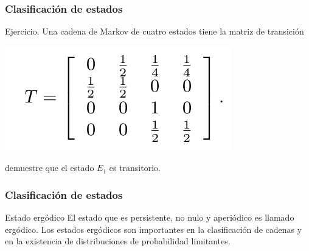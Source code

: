 \documentclass[spanish]{beamer}
\begin{document}
\begin{frame}
\frametitle{Clasificación de estados}
Ejercicio. Una cadena de Markov de cuatro estados tiene la matriz de transición
 
\begin{center}
\includegraphics[scale=0.4]{im45}
\end{center}

demuestre que el estado $E_{1}$ es transitorio.


\end{frame}

\begin{frame}
\frametitle{Clasificación de estados}

\begin{block}{Estado ergódico}
El estado que es persistente, no nulo y aperiódico es llamado ergódico. Los estados ergódicos son importantes en la clasificación de cadenas y en la existencia de distribuciones de probabilidad limitantes.

\end{block}

\end{frame}

\end{document}
